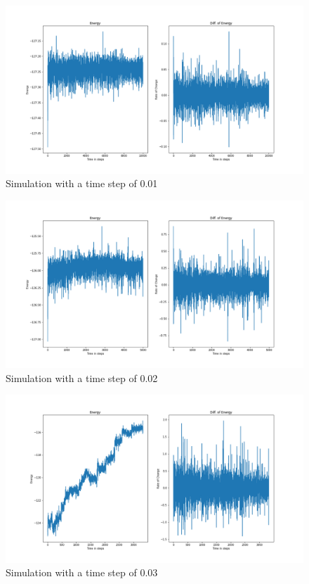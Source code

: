 \begin{figure}[!h]
	\begin{center}
		\includegraphics[scale=1]{Figure/plot_01.png}
	\end{center}
	\caption[Simulation]{Simulation with a time step of 0.01}
	\label{Plot01}
\end{figure}
\begin{figure}[!h]
	\begin{center}
		\includegraphics[scale= 1]{Figure/plot_02.png}
	\end{center}
	\caption[Simulation]{Simulation with a time step of 0.02 }
	\label{Plot02}
\end{figure}
\begin{figure}[!h]
	\begin{center}
		\includegraphics[scale= 1]{Figure/plot_03.png}
	\end{center}
	\caption[Simulation]{Simulation with a time step of 0.03 }
	\label{Plot03}
\end{figure}
